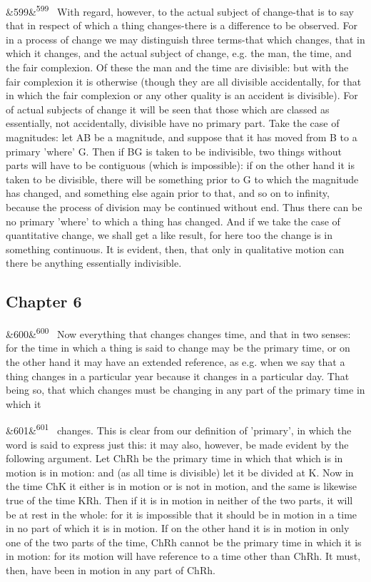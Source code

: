 \documentclass[12pt]{article}
\newcommand{\para}[1][]{\par\noindent\ifx&#1&\else\textsuperscript{\footnotesize #1}~\fi}
\begin{document}
\para[599] With regard, however, to the actual subject of change-that is to say that in respect of which a thing changes-there is a difference to be observed. For in a process of change we may distinguish three terms-that which changes, that in which it changes, and the actual subject of change, e.g. the man, the time, and the fair complexion. Of these the man and the time are divisible: but with the fair complexion it is otherwise (though they are all divisible accidentally, for that in which the fair complexion or any other quality is an accident is divisible). For of actual subjects of change it will be seen that those which are classed as essentially, not accidentally, divisible have no primary part. Take the case of magnitudes: let AB be a magnitude, and suppose that it has moved from B to a primary 'where' G. Then if BG is taken to be indivisible, two things without parts will have to be contiguous (which is impossible): if on the other hand it is taken to be divisible, there will be something prior to G to which the magnitude has changed, and something else again prior to that, and so on to infinity, because the process of division may be continued without end. Thus there can be no primary 'where' to which a thing has changed. And if we take the case of quantitative change, we shall get a like result, for here too the change is in something continuous. It is evident, then, that only in qualitative motion can there be anything essentially indivisible.

\subsection*{Chapter 6}

\para[600] Now everything that changes changes time, and that in two senses: for the time in which a thing is said to change may be the primary time, or on the other hand it may have an extended reference, as e.g. when we say that a thing changes in a particular year because it changes in a particular day. That being so, that which changes must be changing in any part of the primary time in which it

\para[601] changes. This is clear from our definition of 'primary', in which the word is said to express just this: it may also, however, be made evident by the following argument. Let ChRh be the primary time in which that which is in motion is in motion: and (as all time is divisible) let it be divided at K. Now in the time ChK it either is in motion or is not in motion, and the same is likewise true of the time KRh. Then if it is in motion in neither of the two parts, it will be at rest in the whole: for it is impossible that it should be in motion in a time in no part of which it is in motion. If on the other hand it is in motion in only one of the two parts of the time, ChRh cannot be the primary time in which it is in motion: for its motion will have reference to a time other than ChRh. It must, then, have been in motion in any part of ChRh.
\end{document}
